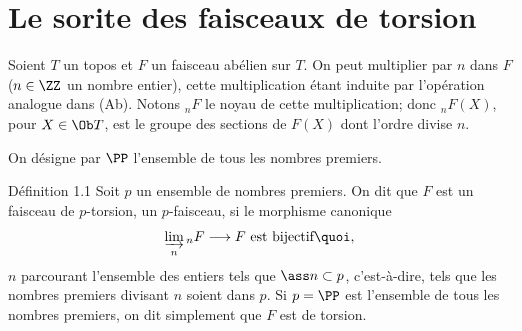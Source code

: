 \documentclass[10pt]{../fichiers-configuration-latex/smfart}
\begin{document}
\section{Le sorite des faisceaux de torsion}

Soient $T$ un topos et $F$ un faisceau abélien sur $T$. On peut
multiplier par $n$ dans $F$ ($n\in \ZZ$ un nombre
entier), cette multiplication étant induite par l'opération analogue
dans (Ab). Notons ${}_nF$ le noyau de cette multiplication; donc
${}_nF(X)$, pour $X\in \Ob T$, est le groupe des sections de $F(X)$
dont l'ordre divise $n$.

On désigne par $\PP$ l'ensemble de tous les nombres
premiers.

\begin{enonce*}{Définition 1.1}
Soit $p$ un ensemble de nombres premiers. On dit que $F$ est un
faisceau de $p$-torsion,  un $p$-faisceau, si le morphisme canonique
$$
\varinjlim_n {}_nF\longrightarrow F\text{ est bijectif}{\quoi},
$$
$n$ parcourant l'ensemble des entiers tels que $\ass n\subset p$,
c'est-à-dire, tels que les nombres premiers divisant $n$ soient dans
$p$. Si $p=\PP$ est l'ensemble de tous les nombres
premiers, on dit simplement que $F$ est de torsion.
\end{enonce*}
\end{document}
